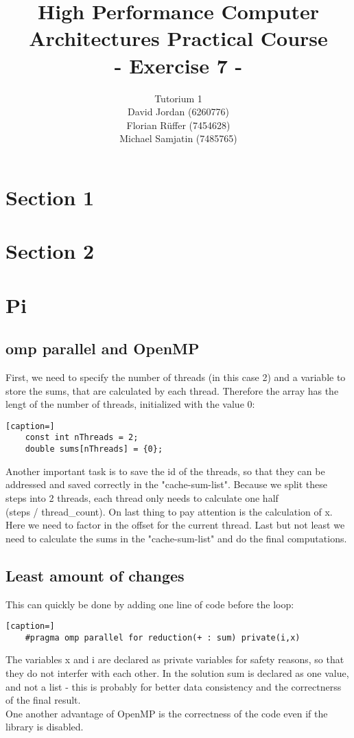 \documentclass{article}
\title{\textbf{High Performance Computer Architectures Practical Course \\ - Exercise 7 -} \\[10mm]}
\author{Tutorium 1 \\[10mm] David Jordan (6260776) \\[1mm] Florian Rüffer (7454628) \\[1mm] Michael Samjatin (7485765) \\[10mm]}
\begin{document}
\maketitle
\newpage
\section*{Section 1}
\section*{Section 2}
\section{Pi}
\subsection{omp parallel and OpenMP}
First, we need to specify the number of threads (in this case 2) and a
variable to store the sums, that are calculated by each thread. Therefore
the array has the lengt of the number of threads, initialized with the
value 0:
\begin{lstlisting}[caption=]
    const int nThreads = 2;
    double sums[nThreads] = {0};
\end{lstlisting}
Another important task is to save the id of the threads, so that they
can be addressed and saved correctly in the "cache-sum-list".
Because we split these steps into 2 threads, each thread only needs
to calculate one half \\(steps / thread\_count). On last thing to pay
attention is the calculation of x. Here we need to factor in the offset
for the current thread. Last but not least we need to calculate the sums
in the "cache-sum-list" and do the final computations.

\subsection*{Least amount of changes}
This can quickly be done by adding one line of code before the loop:
\begin{lstlisting}[caption=]
    #pragma omp parallel for reduction(+ : sum) private(i,x)
\end{lstlisting}
The variables x and i are declared as private variables for safety reasons,
so that they do not interfer with each other. In the solution sum is
declared as one value, and not a list - this is probably for better
data consistency and the correctnerss of the final result.\\
One another advantage of OpenMP is the correctness of the code even if the library
is disabled.
\end{document}
